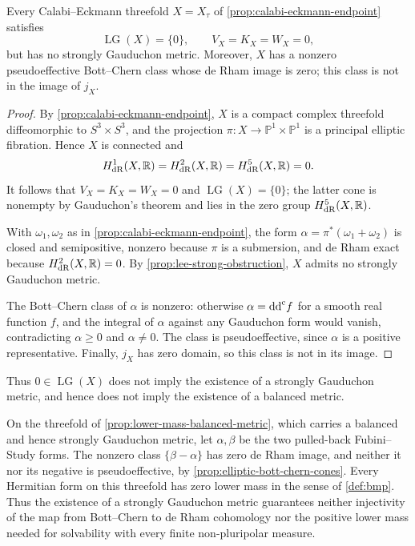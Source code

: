 \begin{example}\label{ex:lee-calabi-eckmann}
Every Calabi--Eckmann threefold $X=X_\tau$ of \cref{prop:calabi-eckmann-endpoint} satisfies
\[
 \operatorname{LG}(X)=\{0\},\qquad V_X=K_X=W_X=0,
\]
but has no strongly Gauduchon metric. Moreover, $X$ has a nonzero pseudoeffective Bott--Chern class whose de Rham image is zero; this class is not in the image of $j_X$.
\end{example}
\begin{proof}
By \cref{prop:calabi-eckmann-endpoint}, $X$ is a compact complex threefold diffeomorphic to $S^3\times S^3$, and the projection $\pi\colon X\to\mathbb P^1\times\mathbb P^1$ is a principal elliptic fibration. Hence $X$ is connected and
\[
 H^1_{\mathrm{dR}}(X,\mathbb R)=H^2_{\mathrm{dR}}(X,\mathbb R)
 =H^5_{\mathrm{dR}}(X,\mathbb R)=0.
\]
It follows that $V_X=K_X=W_X=0$ and $\operatorname{LG}(X)=\{0\}$; the latter cone is nonempty by Gauduchon's theorem and lies in the zero group $H^5_{\mathrm{dR}}(X,\mathbb R)$.

With $\omega_1,\omega_2$ as in \cref{prop:calabi-eckmann-endpoint}, the form $\alpha=\pi^*(\omega_1+\omega_2)$ is closed and semipositive, nonzero because $\pi$ is a submersion, and de Rham exact because $H^2_{\mathrm{dR}}(X,\mathbb R)=0$. By \cref{prop:lee-strong-obstruction}, $X$ admits no strongly Gauduchon metric.

The Bott--Chern class of $\alpha$ is nonzero: otherwise $\alpha=\mathrm{dd}^{\mathrm{c}} f$ for a smooth real function $f$, and the integral of $\alpha$ against any Gauduchon form would vanish, contradicting $\alpha\geq0$ and $\alpha\ne0$. The class is pseudoeffective, since $\alpha$ is a positive representative. Finally, $j_X$ has zero domain, so this class is not in its image.
\end{proof}

Thus $0\in\operatorname{LG}(X)$ does not imply the existence of a strongly Gauduchon metric, and hence does not imply the existence of a balanced metric.

On the threefold of \cref{prop:lower-mass-balanced-metric}, which carries a balanced and hence strongly Gauduchon metric, let $\alpha,\beta$ be the two pulled-back Fubini--Study forms. The nonzero class $\{\beta-\alpha\}$ has zero de Rham image, and neither it nor its negative is pseudoeffective, by \cref{prop:elliptic-bott-chern-cones}. Every Hermitian form on this threefold has zero lower mass in the sense of \cref{def:bmp}. Thus the existence of a strongly Gauduchon metric guarantees neither injectivity of the map from Bott--Chern to de Rham cohomology nor the positive lower mass needed for solvability with every finite non-pluripolar measure.

